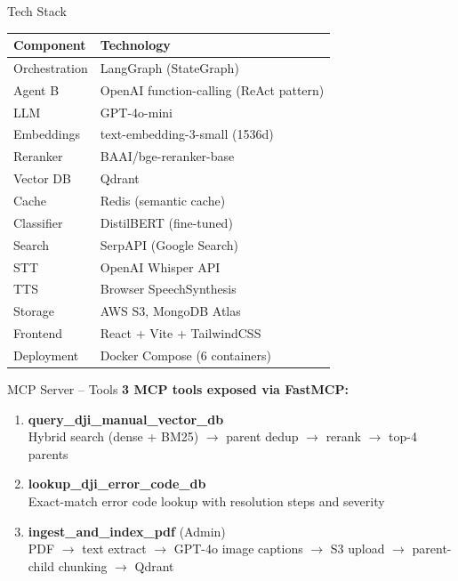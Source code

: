 \documentclass[aspectratio=169]{beamer}
\begin{document}
\begin{frame}{Tech Stack}
\begin{table}
\centering
\small
\begin{tabular}{ll}
\toprule
\textbf{Component} & \textbf{Technology} \\
\midrule
Orchestration & LangGraph (StateGraph) \\
Agent B & OpenAI function-calling (ReAct pattern) \\
LLM & GPT-4o-mini \\
Embeddings & text-embedding-3-small (1536d) \\
Reranker & BAAI/bge-reranker-base \\
Vector DB & Qdrant \\
Cache & Redis (semantic cache) \\
Classifier & DistilBERT (fine-tuned) \\
Search & SerpAPI (Google Search) \\
STT & OpenAI Whisper API \\
TTS & Browser SpeechSynthesis \\
Storage & AWS S3, MongoDB Atlas \\
Frontend & React + Vite + TailwindCSS \\
Deployment & Docker Compose (6 containers) \\
\bottomrule
\end{tabular}
\end{table}
\end{frame}

\begin{frame}{MCP Server -- Tools}
\textbf{3 MCP tools exposed via FastMCP:}

\vspace{0.5em}

\begin{enumerate}
  \item \textbf{query\_dji\_manual\_vector\_db}\\
  \small Hybrid search (dense + BM25) $\rightarrow$ parent dedup $\rightarrow$ rerank $\rightarrow$ top-4 parents
  
  \vspace{0.3em}
  \item \textbf{lookup\_dji\_error\_code\_db}\\
  \small Exact-match error code lookup with resolution steps and severity
  
  \vspace{0.3em}
  \item \textbf{ingest\_and\_index\_pdf} (Admin)\\
  \small PDF $\rightarrow$ text extract $\rightarrow$ GPT-4o image captions $\rightarrow$ S3 upload $\rightarrow$ parent-child chunking $\rightarrow$ Qdrant
\end{enumerate}
\end{frame}
\end{document}
